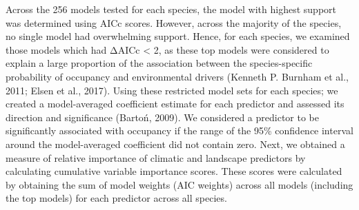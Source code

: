 \documentclass[]{article}
\begin{document}
Across the 256 models tested for each species, the model with highest support was determined using AICc scores. However, across the majority of the species, no single model had overwhelming support. Hence, for each species, we examined those models which had ΔAICc \textless{} 2, as these top models were considered to explain a large proportion of the association between the species-specific probability of occupancy and environmental drivers (Kenneth P. Burnham et al., 2011; Elsen et al., 2017). Using these restricted model sets for each species; we created a model-averaged coefficient estimate for each predictor and assessed its direction and significance (Bartoń, 2009). We considered a predictor to be significantly associated with occupancy if the range of the 95\% confidence interval around the model-averaged coefficient did not contain zero. Next, we obtained a measure of relative importance of climatic and landscape predictors by calculating cumulative variable importance scores. These scores were calculated by obtaining the sum of model weights (AIC weights) across all models (including the top models) for each predictor across all species.
\end{document}

